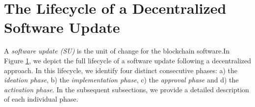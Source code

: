 \section{The Lifecycle of a Decentralized Software Update} \label{lifecycle}
A \emph{software update (SU)} is the unit of change for the blockchain software.In Figure \ref{lifecycle}, we depict 
the full lifecycle of a software update following a decentralized approach. In this lifecycle, we identify four distinct consecutive phases: a) the \emph{ideation phase}, b) the \emph{implementation phase}, c) the \emph{approval phase} and d) the \emph{activation phase}. In the subsequent subsections, we provide a detailed description of each individual phase.


